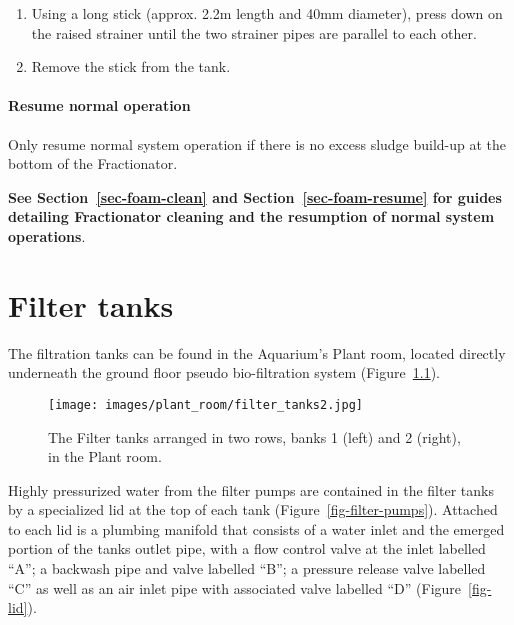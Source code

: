 \documentclass[
  letterpaper,
  DIV=11,
  numbers=noendperiod]{scrreprt}
\providecommand{\tightlist}{%
  \setlength{\itemsep}{0pt}\setlength{\parskip}{0pt}}\usepackage{longtable,booktabs,array}
\begin{document}
\begin{enumerate}
\def\labelenumi{\arabic{enumi}.}
\tightlist
\item
  Using a long stick (approx. 2.2m length and 40mm diameter), press down
  on the raised strainer until the two strainer pipes are parallel to
  each other.
\item
  Remove the stick from the tank.
\end{enumerate}

\hypertarget{resume-normal-operation-2}{%
\subsubsection{Resume normal
operation}\label{resume-normal-operation-2}}

{Only resume normal system operation if there is no excess sludge
build-up at the bottom of the Fractionator}.

\textbf{See Section~\ref{sec-foam-clean} and
Section~\ref{sec-foam-resume} for guides detailing Fractionator cleaning
and the resumption of normal system operations}.

\hypertarget{filter-tanks}{%
\chapter{Filter tanks}\label{filter-tanks}}

The filtration tanks can be found in the Aquarium's Plant room, located
directly underneath the ground floor pseudo bio-filtration system
(Figure~\ref{fig-ft}).

\begin{figure}[H]

{\centering \texttt{[image: images/plant\_room/filter\_tanks2.jpg]}

}

\caption{\label{fig-ft}The Filter tanks arranged in two rows, banks 1
(left) and 2 (right), in the Plant room.}

\end{figure}

Highly pressurized water from the filter pumps are contained in the
filter tanks by a specialized lid at the top of each tank
(Figure~\ref{fig-filter-pumps}). Attached to each lid is a plumbing
manifold that consists of a water inlet and the emerged portion of the
tanks outlet pipe, with a flow control valve at the inlet labelled
``A''; a backwash pipe and valve labelled ``B''; a pressure release
valve labelled ``C'' as well as an air inlet pipe with associated valve
labelled ``D'' (Figure~\ref{fig-lid}).
\end{document}
